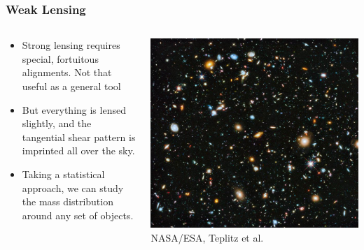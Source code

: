\documentclass{beamer}
\begin{document}
\frame
{
    \frametitle{Weak Lensing}

    \begin{columns}
        \begin{column}{0.5\textwidth}    
            \begin{itemize}

                \item Strong lensing requires special, fortuitous alignments.
                    Not that useful as a general tool

                \item But everything is lensed slightly, and the {\color{gold} tangential shear}
                    pattern is imprinted all over the sky.

                \item Taking a statistical approach, we can study the mass
                    distribution around any set of objects.

            \end{itemize}
        \end{column}
        \begin{column}{0.5\textwidth}
            \begin{center}
                \includegraphics[width=\textwidth]{hubble-ultra-deep-scaled.jpg}
                \newline
                {\tiny  NASA/ESA, Teplitz et al.}
            \end{center}
        \end{column}
    \end{columns}
}
\end{document}
